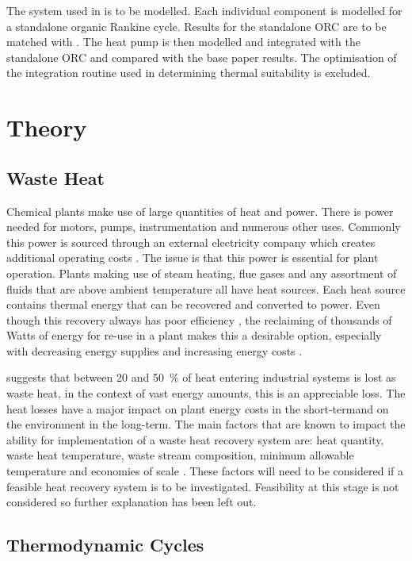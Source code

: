 \documentclass[a4paper,12pt]{article}
\begin{document}
The system used in \textcite{YU2018330} is to be modelled. Each individual component is modelled for a standalone organic Rankine cycle. Results for the standalone ORC are to be matched with \textcite{YU2018330}. The heat pump is then modelled and integrated with the standalone ORC and compared with the base paper results. The optimisation of the integration routine used in determining thermal suitability is excluded.

\newpage
\section{Theory}

\subsection{Waste Heat}

Chemical plants make use of large quantities of heat and power. There is power needed for motors, pumps, instrumentation and numerous other uses. Commonly this power is sourced through an external electricity company which creates additional operating costs \parencite{Kemp2007}. The issue is that this power is essential for plant operation. Plants making use of steam heating, flue gases and any assortment of fluids that are above ambient temperature all have heat sources. Each heat source contains thermal energy that can be recovered and converted to power. Even though this recovery always has poor efficiency \parencite{ShaumThermo}, the reclaiming of thousands of Watts of energy for re-use in a plant makes this a desirable option, especially with decreasing energy supplies and increasing energy costs \parencite{Kemp2007}.  

\textcite{BCS2008} suggests that between 20 and \SI{50}{\%} of heat entering industrial systems is lost as waste heat, in the context of vast energy amounts, this is an appreciable loss. The heat losses have a major impact on plant energy costs in the short-termand on the environment in the long-term. The main factors that are known to impact the ability for implementation of a waste heat recovery system are: heat quantity, waste heat temperature, waste stream composition, minimum allowable temperature and economies of scale \parencite{BCS2008}. These factors will need to be considered if a feasible heat recovery system is to be investigated. Feasibility at this stage is not considered so further explanation has been left out.
\subsection{Thermodynamic Cycles}
\end{document}
